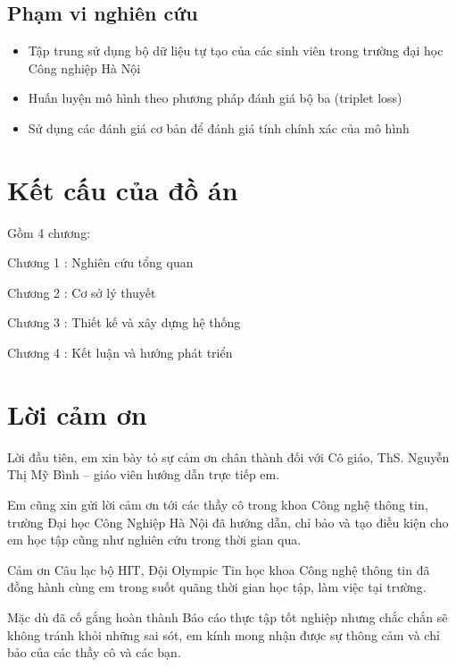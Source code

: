 \subsection{Phạm vi nghiên cứu}
\begin{itemize}
    \item Tập trung sử dụng bộ dữ liệu tự tạo của các sinh viên trong trường đại học Công nghiệp Hà Nội
    \item Huấn luyện mô hình theo phương pháp đánh giá bộ ba (triplet loss)
    \item Sử dụng các đánh giá cơ bản để đánh giá tính chính xác của mô hình
\end{itemize}

\newpage
\section{Kết cấu của đồ án}
Gồm 4 chương:

Chương 1 : Nghiên cứu tổng quan

Chương 2 : Cơ sở lý thuyết

Chương 3 : Thiết kế và xây dựng hệ thống

Chương 4 : Kết luận và hướng phát triển


\section{Lời cảm ơn}

Lời đầu tiên, em xin bày tỏ sự cảm ơn chân thành đối với Cô giáo, ThS.
Nguyễn Thị Mỹ Bình – giáo viên hướng dẫn trực tiếp em.

Em cũng xin gửi lời cảm ơn tới các thầy cô trong khoa Công nghệ thông tin,
trường Đại học Công Nghiệp Hà Nội đã hướng dẫn, chỉ bảo và tạo điều kiện cho em
học tập cũng như nghiên cứu trong thời gian qua.

Cảm ơn Câu lạc bộ HIT, Đội Olympic Tin học khoa Công nghệ thông tin đã đồng hành
cùng em trong suốt quãng thời gian học tập, làm việc tại trường.

Mặc dù đã cố gắng hoàn thành Báo cáo thực tập tốt nghiệp nhưng chắc chắn
sẽ không tránh khỏi những sai sót, em kính mong nhận được sự thông cảm và chỉ
bảo của các thầy cô và các bạn.


